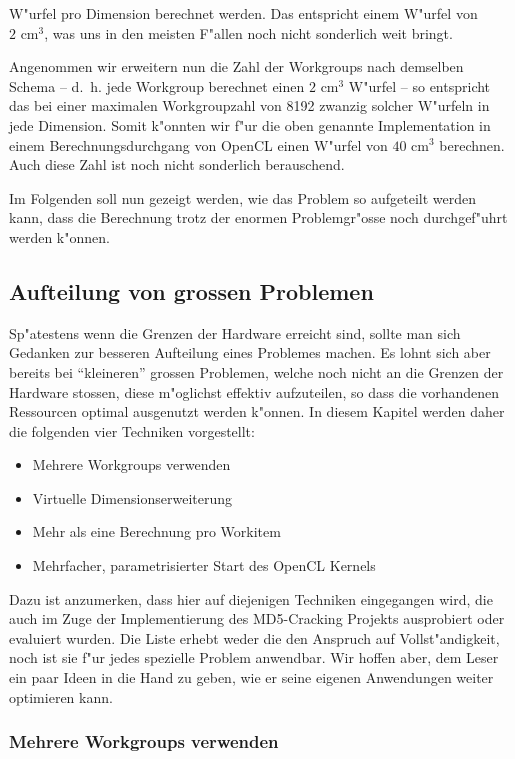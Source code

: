 \begin{refsection}
\noindent W"urfel pro Dimension berechnet werden. Das entspricht einem W"urfel von 
$2\textrm{ cm}^{3}$, was uns in den meisten F"allen noch nicht sonderlich weit bringt.

Angenommen wir erweitern nun die Zahl der Workgroups nach demselben Schema --
d.~h. jede Workgroup berechnet einen $2\textrm{ cm}^{3}$ W"urfel -- so
entspricht das bei einer maximalen Workgroupzahl von 8192 zwanzig solcher
W"urfeln in jede Dimension. Somit k"onnten wir f"ur die oben genannte
Implementation in einem Berechnungsdurchgang von OpenCL einen W"urfel von
$40\textrm{ cm}^{3}$ berechnen. Auch diese Zahl ist noch nicht sonderlich
berauschend. 

Im Folgenden soll nun gezeigt werden, wie das Problem so aufgeteilt werden kann,
dass die Berechnung trotz der enormen Problemgr"osse noch durchgef"uhrt werden
k"onnen.

\subsection{Aufteilung von grossen Problemen}

Sp"atestens wenn die Grenzen der Hardware erreicht sind, sollte man sich
Gedanken zur besseren Aufteilung eines Problemes machen. Es lohnt sich aber
bereits bei ``kleineren'' grossen Problemen, welche noch nicht an die Grenzen
der Hardware stossen, diese m"oglichst effektiv aufzuteilen, so dass die
vorhandenen Ressourcen optimal ausgenutzt werden k"onnen.  In diesem Kapitel
werden daher die folgenden vier Techniken vorgestellt:

\begin{itemize}
 \item Mehrere Workgroups verwenden
 \item Virtuelle Dimensionserweiterung
 \item Mehr als eine Berechnung pro Workitem
 \item Mehrfacher, parametrisierter Start des OpenCL Kernels
\end{itemize}

Dazu ist anzumerken, dass hier auf diejenigen Techniken eingegangen wird, die
auch im Zuge der Implementierung des MD5-Cracking Projekts ausprobiert oder
evaluiert wurden. Die Liste erhebt weder die den Anspruch auf Vollst"andigkeit,
noch ist sie f"ur jedes spezielle Problem anwendbar. Wir hoffen aber, dem Leser
ein paar Ideen in die Hand zu geben, wie er seine eigenen Anwendungen weiter
optimieren kann.

\subsubsection{Mehrere Workgroups verwenden}


\end{refsection}
